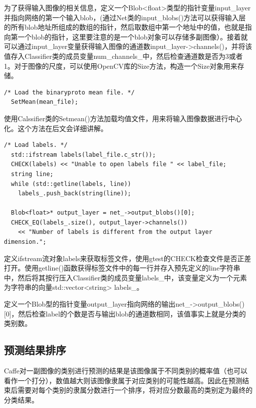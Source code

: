为了获得输入图像的相关信息，定义一个Blob<float>类型的指针变量input\_layer并指向网络的第一个输入blob，(通过Net类的input\_blobs()方法可以获得输入层的所有blob地址所组成的数组的指针，然后取数组中第一个地址中的值，也就是指向第一个blob的指针，这里要注意的是一个blob对象可以存储多副图像）。接着就可以通过input\_layer变量获得输入图像的通道数input\_layer->channels()，并将该值存入Classifier类的成员变量num\_channels\_中，然后检查通道数是否为3或者1。对于图像的尺度，可以使用OpenCV库的Size方法，构造一个Size对象用来存储。

\begin{verbatim}
/* Load the binaryproto mean file. */
  SetMean(mean_file);
\end{verbatim}
使用Calssifier类的Setmean()方法加载均值文件，用来将输入图像数据进行中心化。这个方法在后文会详细讲解。

\begin{verbatim}
/* Load labels. */
  std::ifstream labels(label_file.c_str());
  CHECK(labels) << "Unable to open labels file " << label_file;
  string line;
  while (std::getline(labels, line))
    labels_.push_back(string(line));

  Blob<float>* output_layer = net_->output_blobs()[0];
  CHECK_EQ(labels_.size(), output_layer->channels())
    << "Number of labels is different from the output layer dimension.";
\end{verbatim}
定义ifstream流对象labels来获取标签文件，使用gtest的CHECK检查文件是否正差打开。使用getline()函数获得标签文件中的每一行并存入预先定义的line字符串中，然后将其按行压入Classifier类的成员变量labels\_中，该变量定义为一个元素为字符串的向量std::vector<string> labels\_。


定义一个Blob型的指针变量output\_layer指向网络的输出net\_->output\_blobs()[0]，然后检查label的个数是否与输出blob的通道数相同，该值事实上就是分类的类别数。

\subsection{预测结果排序}
Caffe对一副图像的类别进行预测的结果是该图像属于不同类别的概率值（也可以看作一个打分），数值越大则该图像隶属于对应类别的可能性越高。因此在预测结束后需要对每个类别的隶属分数进行一个排序，将对应分数最高的类别定为最终的分类结果。



